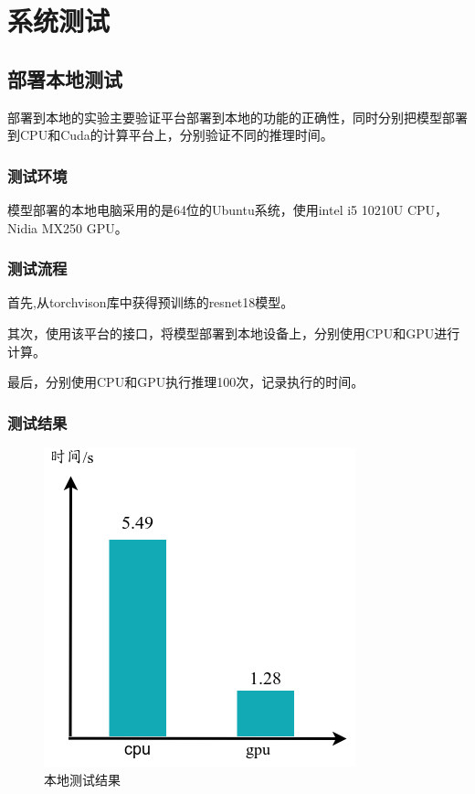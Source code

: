 \chapter{系统测试}


\section{部署本地测试}

部署到本地的实验主要验证平台部署到本地的功能的正确性，同时分别把模型部署到CPU和Cuda的计算平台上，分别验证不同的推理时间。

\subsection{测试环境}

模型部署的本地电脑采用的是64位的Ubuntu系统，使用intel i5 10210U CPU，Nidia MX250 GPU。


\subsection{测试流程}

首先,从torchvison库中获得预训练的resnet18模型。

其次，使用该平台的接口，将模型部署到本地设备上，分别使用CPU和GPU进行计算。

最后，分别使用CPU和GPU执行推理100次，记录执行的时间。

\subsection{测试结果}

\begin{figure}[h!]
    \centering
    \includegraphics[width=180bp]{figure/expr_local.png}
    \caption{本地测试结果}
    \label{expr_local}
\end{figure}

